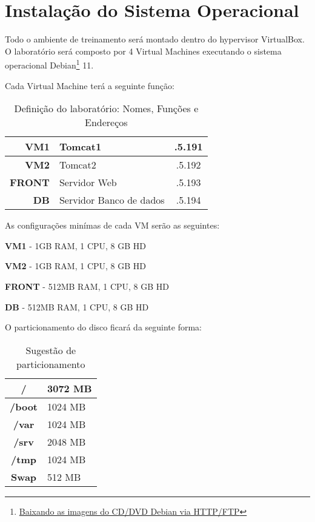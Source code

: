 \section{Instalação do Sistema Operacional}

Todo o ambiente de treinamento será montado dentro do hypervisor VirtualBox.
O laboratório será composto por 4 Virtual Machines executando o sistema operacional Debian\footnote{\href{https://www.debian.org/CD/http-ftp/}{Baixando as imagens do CD/DVD Debian via HTTP/FTP}} 11.

Cada Virtual Machine terá a seguinte função:
\begin{table}[h]
	\caption{Definição do laboratório: Nomes, Funções e Endereços}
	\centering
	\begin{tabularx}{0.69\textwidth}{D|X|C}
		\firacoderetina\textbf{VM1} 	& \ubuntu Tomcat1      				& .5.191 \\ \hline
		\firacoderetina\textbf{VM2}    & \ubuntu Tomcat2      				& .5.192 \\ \hline
		\firacoderetina\textbf{FRONT}  & \ubuntu Servidor Web 				& .5.193 \\ \hline
		\firacoderetina\textbf{DB}  	& \ubuntu Servidor Banco de dados 	& .5.194 \\ \hline
	\end{tabularx}
\end{table}

As configurações minímas de cada VM serão as seguintes:

\begin{list}{•}{}
	\setlength{\leftskip}{1.8cm} 
	\setlength{\rightskip}{0pt plus 1.0cm}
	\setlength{\parindent}{-1.8cm}
\item \textbf{VM1} - 1GB RAM, 1 CPU, 8 GB HD
\item \textbf{VM2} - 1GB RAM, 1 CPU, 8 GB HD
\item \textbf{FRONT} - 512MB RAM, 1 CPU, 8 GB HD
\item \textbf{DB} - 512MB RAM, 1 CPU, 8 GB HD
\end{list}

O particionamento do disco ficará da seguinte forma:
\begin{table}[H]
	\caption{Sugestão de particionamento}
	\centering
	\begin{tabularx}{0.4\textwidth}{||C|X||}
		\hline
		\textbf{/}     & 3072 MB \\ \hline
		\textbf{/boot} & 1024 MB \\ \hline
		\textbf{/var}  & 1024 MB \\ \hline
		\textbf{/srv}  & 2048 MB \\ \hline
		\textbf{/tmp}  & 1024 MB \\ \hline
		\textbf{Swap}  &  512 MB \\ \hline
	\end{tabularx}
\end{table}	


